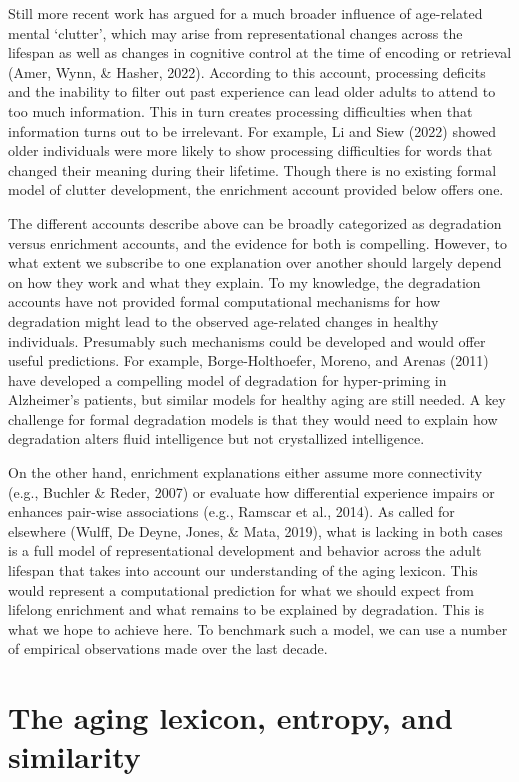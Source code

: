 \documentclass[
  man,floatsintext]{apa6}
\begin{document}
Still more recent work has argued for a much broader influence of age-related mental `clutter', which may arise from representational changes across the lifespan as well as changes in cognitive control at the time of encoding or retrieval (Amer, Wynn, \& Hasher, 2022). According to this account, processing deficits and the inability to filter out past experience can lead older adults to attend to too much information. This in turn creates processing difficulties when that information turns out to be irrelevant. For example, Li and Siew (2022) showed older individuals were more likely to show processing difficulties for words that changed their meaning during their lifetime. Though there is no existing formal model of clutter development, the enrichment account provided below offers one.

The different accounts describe above can be broadly categorized as degradation versus enrichment accounts, and the evidence for both is compelling. However, to what extent we subscribe to one explanation over another should largely depend on how they work and what they explain. To my knowledge, the degradation accounts have not provided formal computational mechanisms for how degradation might lead to the observed age-related changes in healthy individuals. Presumably such mechanisms could be developed and would offer useful predictions. For example, Borge-Holthoefer, Moreno, and Arenas (2011) have developed a compelling model of degradation for hyper-priming in Alzheimer's patients, but similar models for healthy aging are still needed. A key challenge for formal degradation models is that they would need to explain how degradation alters fluid intelligence but not crystallized intelligence.

On the other hand, enrichment explanations either assume more connectivity (e.g., Buchler \& Reder, 2007) or evaluate how differential experience impairs or enhances pair-wise associations (e.g., Ramscar et al., 2014). As called for elsewhere (Wulff, De Deyne, Jones, \& Mata, 2019), what is lacking in both cases is a full model of representational development and behavior across the adult lifespan that takes into account our understanding of the aging lexicon. This would represent a computational prediction for what we should expect from lifelong enrichment and what remains to be explained by degradation. This is what we hope to achieve here. To benchmark such a model, we can use a number of empirical observations made over the last decade.

\hypertarget{the-aging-lexicon-entropy-and-similarity}{%
\section{The aging lexicon, entropy, and similarity}\label{the-aging-lexicon-entropy-and-similarity}}
\end{document}
